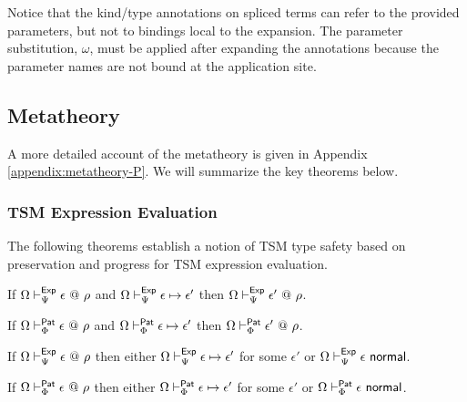 Notice that the kind/type annotations on spliced terms can refer to the provided parameters, but not to bindings local to the expansion. The parameter substitution, $\omega$, must be applied after expanding the annotations because the parameter names are not bound at the application site.

\subsection{Metatheory}
A more detailed account of the metatheory is given in Appendix \ref{appendix:metatheory-P}. We will summarize the key theorems below.

\subsubsection{TSM Expression Evaluation}
The following theorems establish a notion of TSM type safety based on preservation and progress for TSM expression evaluation.

\begingroup
\def\thetheorem{\ref{thm:peTSM-preservation}}
\begin{theorem}
If $\Omega \vdash_{\Psi}^{\mathsf{Exp}} \epsilon ~@~ \rho$ and $\Omega \vdash_{\Psi}^\mathsf{Exp} \epsilon \mapsto \epsilon'$ then $\Omega \vdash_{\Psi}^{\mathsf{Exp}} \epsilon' ~@~ \rho$.
\end{theorem}
\endgroup

\begingroup
\def\thetheorem{\ref{thm:ppTSM-preservation}}
\begin{theorem}
If $\Omega \vdash_{\Phi}^{\mathsf{Pat}} \epsilon ~@~ \rho$ and $\Omega \vdash_{\Phi}^\mathsf{Pat} \epsilon \mapsto \epsilon'$ then $\Omega \vdash_{\Phi}^{\mathsf{Pat}} \epsilon' ~@~ \rho$.
\end{theorem}
\endgroup

\begingroup
\def\thetheorem{\ref{thm:peTSM-progress}}
\begin{theorem}
If $\Omega \vdash_{\Psi}^{\mathsf{Exp}} \epsilon ~@~ \rho$ then either $\Omega \vdash_{\Psi}^\mathsf{Exp} \epsilon \mapsto \epsilon'$ for some $\epsilon'$ or $\Omega \vdash_{\Psi}^\mathsf{Exp} \epsilon~\mathsf{normal}$.
\end{theorem}
\endgroup

\begingroup
\def\thetheorem{\ref{thm:ppTSM-progress}}
\begin{theorem}
If $\Omega \vdash_{\Phi}^{\mathsf{Pat}} \epsilon ~@~ \rho$ then either $\Omega \vdash_{\Phi}^\mathsf{Pat} \epsilon \mapsto \epsilon'$ for some $\epsilon'$ or $\Omega \vdash_{\Phi}^\mathsf{Pat} \epsilon~\mathsf{normal}$.
\end{theorem}
\endgroup

